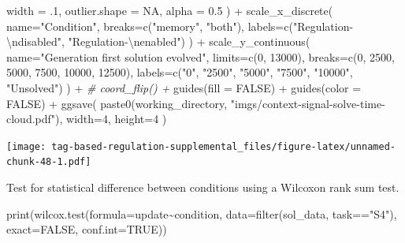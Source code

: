 \documentclass[
]{book}
\newenvironment{Shaded}{\begin{snugshade}}{\end{snugshade}}
\newcommand{\AttributeTok}[1]{\textcolor[rgb]{0.77,0.63,0.00}{#1}}
\newcommand{\CommentTok}[1]{\textcolor[rgb]{0.56,0.35,0.01}{\textit{#1}}}
\newcommand{\ConstantTok}[1]{\textcolor[rgb]{0.00,0.00,0.00}{#1}}
\newcommand{\DecValTok}[1]{\textcolor[rgb]{0.00,0.00,0.81}{#1}}
\newcommand{\FloatTok}[1]{\textcolor[rgb]{0.00,0.00,0.81}{#1}}
\newcommand{\FunctionTok}[1]{\textcolor[rgb]{0.00,0.00,0.00}{#1}}
\newcommand{\NormalTok}[1]{#1}
\newcommand{\SpecialCharTok}[1]{\textcolor[rgb]{0.00,0.00,0.00}{#1}}
\newcommand{\StringTok}[1]{\textcolor[rgb]{0.31,0.60,0.02}{#1}}
\begin{document}
\begin{Shaded}
\begin{Highlighting}[]
    \AttributeTok{width =}\NormalTok{ .}\DecValTok{1}\NormalTok{,}
    \AttributeTok{outlier.shape =} \ConstantTok{NA}\NormalTok{,}
    \AttributeTok{alpha =} \FloatTok{0.5}
\NormalTok{  ) }\SpecialCharTok{+}
  \FunctionTok{scale\_x\_discrete}\NormalTok{(}
    \AttributeTok{name=}\StringTok{"Condition"}\NormalTok{,}
    \AttributeTok{breaks=}\FunctionTok{c}\NormalTok{(}\StringTok{"memory"}\NormalTok{, }\StringTok{"both"}\NormalTok{),}
    \AttributeTok{labels=}\FunctionTok{c}\NormalTok{(}\StringTok{"Regulation{-}}\SpecialCharTok{\textbackslash{}n}\StringTok{disabled"}\NormalTok{, }\StringTok{"Regulation{-}}\SpecialCharTok{\textbackslash{}n}\StringTok{enabled"}\NormalTok{)}
\NormalTok{  ) }\SpecialCharTok{+}
  \FunctionTok{scale\_y\_continuous}\NormalTok{(}
    \AttributeTok{name=}\StringTok{"Generation first solution evolved"}\NormalTok{,}
    \AttributeTok{limits=}\FunctionTok{c}\NormalTok{(}\DecValTok{0}\NormalTok{, }\DecValTok{13000}\NormalTok{),}
    \AttributeTok{breaks=}\FunctionTok{c}\NormalTok{(}\DecValTok{0}\NormalTok{, }\DecValTok{2500}\NormalTok{, }\DecValTok{5000}\NormalTok{, }\DecValTok{7500}\NormalTok{, }\DecValTok{10000}\NormalTok{, }\DecValTok{12500}\NormalTok{),}
    \AttributeTok{labels=}\FunctionTok{c}\NormalTok{(}\StringTok{"0"}\NormalTok{, }\StringTok{"2500"}\NormalTok{, }\StringTok{"5000"}\NormalTok{, }\StringTok{"7500"}\NormalTok{, }\StringTok{"10000"}\NormalTok{, }\StringTok{"Unsolved"}\NormalTok{)}
\NormalTok{  ) }\SpecialCharTok{+}
  \CommentTok{\# coord\_flip() +}
  \FunctionTok{guides}\NormalTok{(}\AttributeTok{fill =} \ConstantTok{FALSE}\NormalTok{) }\SpecialCharTok{+}
  \FunctionTok{guides}\NormalTok{(}\AttributeTok{color =} \ConstantTok{FALSE}\NormalTok{) }\SpecialCharTok{+}
  \FunctionTok{ggsave}\NormalTok{(}
    \FunctionTok{paste0}\NormalTok{(working\_directory, }\StringTok{"imgs/context{-}signal{-}solve{-}time{-}cloud.pdf"}\NormalTok{),}
    \AttributeTok{width=}\DecValTok{4}\NormalTok{,}
    \AttributeTok{height=}\DecValTok{4}
\NormalTok{  )}
\end{Highlighting}
\end{Shaded}

\texttt{[image: tag-based-regulation-supplemental\_files/figure-latex/unnamed-chunk-48-1.pdf]}

Test for statistical difference between conditions using a Wilcoxon rank sum test.

\begin{Shaded}
\begin{Highlighting}[]
\FunctionTok{print}\NormalTok{(}\FunctionTok{wilcox.test}\NormalTok{(}\AttributeTok{formula=}\NormalTok{update}\SpecialCharTok{\textasciitilde{}}\NormalTok{condition, }\AttributeTok{data=}\FunctionTok{filter}\NormalTok{(sol\_data, task}\SpecialCharTok{==}\StringTok{"S4"}\NormalTok{), }\AttributeTok{exact=}\ConstantTok{FALSE}\NormalTok{, }\AttributeTok{conf.int=}\ConstantTok{TRUE}\NormalTok{))}
\end{Highlighting}
\end{Shaded}
\end{document}
